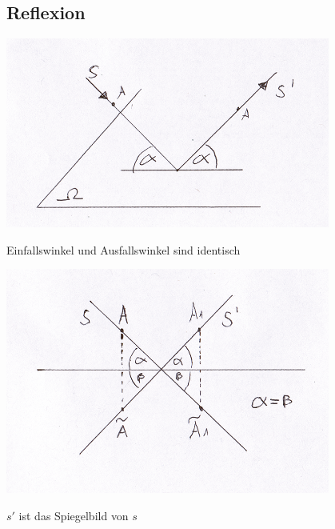 \subsection{Reflexion}
\begin{center}
	\includegraphics[width=0.8\textwidth]{imgs/Reflexion_Winkel.png}
\end{center}
Einfallswinkel und Ausfallswinkel sind identisch\\
\begin{center}
	\includegraphics[width=0.8\textwidth]{imgs/Reflexion_Spiegelbild.png}
\end{center}
$s'$ ist das Spiegelbild von $s$\\
\newpage
